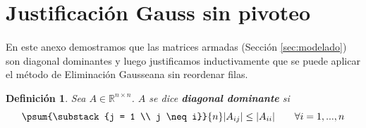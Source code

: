 \documentclass[12pt]{article}
\newtheorem{defi}{Definición}
\begin{document}

\appendix %
\renewcommand{\thesection}{\Roman{section}}

\section{Justificación Gauss sin pivoteo} 
\label{appendix:justificacion}

\paragraph{} En este anexo demostramos que las matrices armadas (Sección \ref{sec:modelado}) son diagonal dominantes y luego justificamos inductivamente que se puede aplicar el método de Eliminación Gausseana sin reordenar filas.

\begin{defi}
Sea \(A \in \mathbb{R}^{n \times n}\). \(A\) se dice \textbf{diagonal dominante} si 
\[
  \psum{\substack{j = 1 \\ j \neq i}}{n}|A_{ij}| \leq  |A_{ii}| \qquad \forall i = 1, ..., n
\]
\end{defi}
\end{document}
